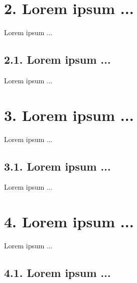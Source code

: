 \documentclass[12pt]{article}
\begin{document}

\section*{2. Lorem ipsum ...}

Lorem ipsum ...

\subsection*{2.1. Lorem ipsum ...}

Lorem ipsum ...




\section*{3. Lorem ipsum ...}

Lorem ipsum ...

\subsection*{3.1. Lorem ipsum ...}

Lorem ipsum ...

\section*{4. Lorem ipsum ...}

Lorem ipsum ...

\subsection*{4.1. Lorem ipsum ...}
\end{document}
